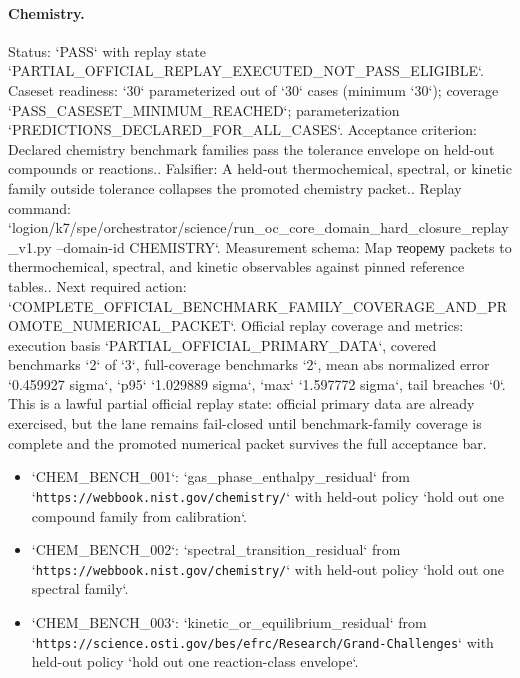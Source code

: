 \paragraph{Chemistry.}
Status: `PASS` with replay state `PARTIAL\_OFFICIAL\_REPLAY\_EXECUTED\_NOT\_PASS\_ELIGIBLE`.
Caseset readiness: `30` parameterized out of `30` cases (minimum `30`); coverage `PASS\_CASESET\_MINIMUM\_REACHED`; parameterization `PREDICTIONS\_DECLARED\_FOR\_ALL\_CASES`.
Acceptance criterion: Declared chemistry benchmark families pass the tolerance envelope on held-out compounds or reactions..
Falsifier: A held-out thermochemical, spectral, or kinetic family outside tolerance collapses the promoted chemistry packet..
Replay command: `logion/k7/spe/orchestrator/science/run\_oc\_core\_domain\_hard\_closure\_replay\_v1.py --domain-id CHEMISTRY`.
Measurement schema: Map теорему packets to thermochemical, spectral, and kinetic observables against pinned reference tables..
Next required action: `COMPLETE\_OFFICIAL\_BENCHMARK\_FAMILY\_COVERAGE\_AND\_PROMOTE\_NUMERICAL\_PACKET`.
Official replay coverage and metrics: execution basis `PARTIAL\_OFFICIAL\_PRIMARY\_DATA`, covered benchmarks `2` of `3`, full-coverage benchmarks `2`, mean abs normalized error `0.459927 sigma`, `p95` `1.029889 sigma`, `max` `1.597772 sigma`, tail breaches `0`.
This is a lawful partial official replay state: official primary data are already exercised, but the lane remains fail-closed until benchmark-family coverage is complete and the promoted numerical packet survives the full acceptance bar.
\begin{itemize}
\item `CHEM\_BENCH\_001`: `gas\_phase\_enthalpy\_residual` from `\texttt{https://webbook.nist.gov/chemistry/}` with held-out policy `hold out one compound family from calibration`.
\item `CHEM\_BENCH\_002`: `spectral\_transition\_residual` from `\texttt{https://webbook.nist.gov/chemistry/}` with held-out policy `hold out one spectral family`.
\item `CHEM\_BENCH\_003`: `kinetic\_or\_equilibrium\_residual` from `\texttt{https://science.osti.gov/bes/efrc/Research/Grand-Challenges}` with held-out policy `hold out one reaction-class envelope`.
\end{itemize}

